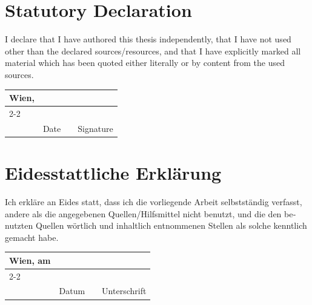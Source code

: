 
\section*{Statutory Declaration}

I declare that I have authored this thesis independently, that I have
not used other than the declared sources/resources, and that I have
explicitly marked all material which has been quoted either literally
or by content from the used sources.

\vfill

\newcommand{\mysignatureblock}[3]{%
  \begin{tabular}{llp{2em}l} 
  #1 & \hspace{5cm}        & & \hspace{6cm} \\\cline{2-2}\cline{4-4}
     &                     & & \\[-3mm]
     & {\footnotesize #2}  & & {\footnotesize #3}
  \end{tabular}
}

\mysignatureblock{Wien,}{Date}{Signature}

\vfill
\vfill
\vfill
\vfill

\section*{Eidesstattliche Erklärung}

\foreignlanguage{ngerman}{%
Ich erkläre an Eides statt, dass ich die
vorliegende Arbeit selbstständig verfasst, andere als die angegebenen
Quellen/Hilfsmittel nicht benutzt, und die den benutzten Quellen
wörtlich und inhaltlich entnommenen Stellen als solche kenntlich
gemacht habe.}

\vfill

\mysignatureblock{Wien, am}{Datum}{Unterschrift}


\newpage
\newpage

